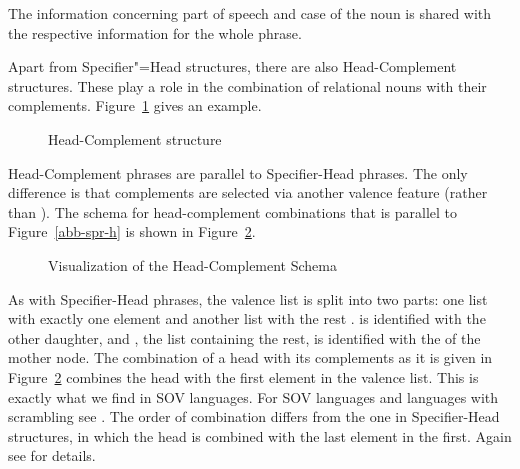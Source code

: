 \documentclass[output=paper
  ,nobabel
  ,draftmode
  ,uniformtopskip %
  ,colorlinks, citecolor=brown
]{langscibook}
\begin{document}
\newpage
The information concerning part of speech and case of the noun is shared with the respective
information for the whole phrase.

Apart from Specifier"=Head structures, there are also Head-Complement structures. These play a role
in the combination of relational nouns with their complements. Figure~\ref{abb-head-comp} gives an example.

\begin{figure}
\caption{Head-Complement structure}\label{abb-head-comp}
\end{figure}

\largerpage
Head-Complement phrases are parallel to Specifier-Head phrases. The only difference is that
complements are selected via another valence feature (\comps rather than \spr). The schema for
head-complement combinations that is parallel to Figure~\ref{abb-spr-h} is shown in Figure~\ref{abb-kopf-comp}.
\begin{figure}
\hfill
{}
\hfill\mbox{}
\caption{Visualization of the Head-Complement Schema}\label{abb-kopf-comp}
\end{figure}
As with Specifier-Head phrases, the valence list is split into two parts: one list with exactly one element  and another list with the rest .  is identified with the other
daughter, and , the list containing the rest, is identified with the \compsv of the mother
node. The combination of a head with its complements as it is given in Figure~\ref{abb-kopf-comp}
combines the head with the first element in the valence list. This is exactly what we find in SOV
languages. For SOV languages and languages with scrambling see
\parencites[Sections~9.1.1, 9.4]{MuellerGT-Eng4}[Sections~3, 4]{MuellerOrder}. The order of combination differs from the one in Specifier-Head
structures, in which the head is combined with the last element in the \sprl first. Again see
 for details.
\end{document}
